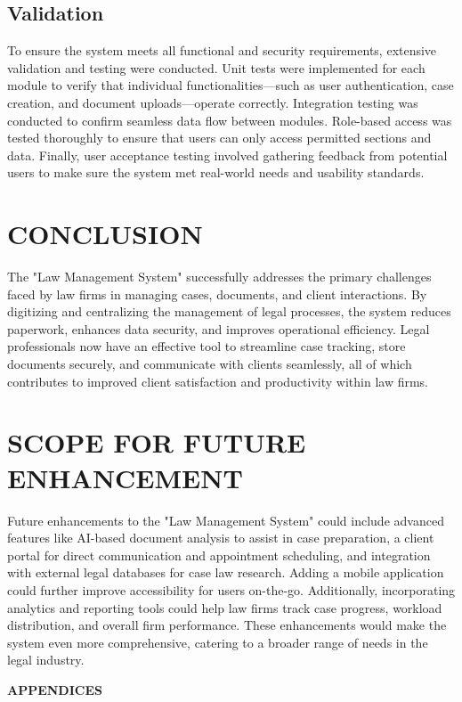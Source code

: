 \section{Validation}
%
To ensure the system meets all functional and security requirements, extensive validation and testing were conducted. Unit tests were implemented for each module to verify that individual functionalities—such as user authentication, case creation, and document uploads—operate correctly. Integration testing was conducted to confirm seamless data flow between modules. Role-based access was tested thoroughly to ensure that users can only access permitted sections and data. Finally, user acceptance testing involved gathering feedback from potential users to make sure the system met real-world needs and usability standards.
\chapter{CONCLUSION}
%
The "Law Management System" successfully addresses the primary challenges faced by law firms in managing cases, documents, and client interactions. By digitizing and centralizing the management of legal processes, the system reduces paperwork, enhances data security, and improves operational efficiency. Legal professionals now have an effective tool to streamline case tracking, store documents securely, and communicate with clients seamlessly, all of which contributes to improved client satisfaction and productivity within law firms.
\chapter{SCOPE FOR FUTURE ENHANCEMENT}
%
%
%
Future enhancements to the "Law Management System" could include advanced features like AI-based document analysis to assist in case preparation, a client portal for direct communication and appointment scheduling, and integration with external legal databases for case law research. Adding a mobile application could further improve accessibility for users on-the-go. Additionally, incorporating analytics and reporting tools could help law firms track case progress, workload distribution, and overall firm performance. These enhancements would make the system even more comprehensive, catering to a broader range of needs in the legal industry.
\clearpage
{}
\appendix
\quad\vfill
\begin{center}
{\Huge \bf APPENDICES}
\end{center}
\vfill
\clearpage
%
%
%
%

